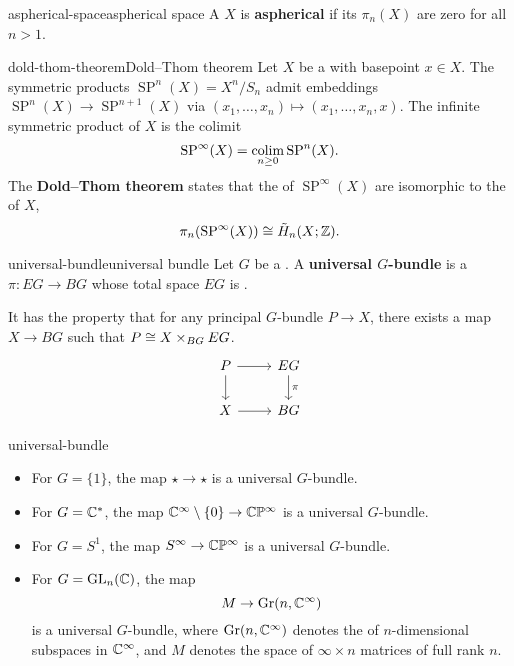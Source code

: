 \begin{topic}{aspherical-space}{aspherical space}
    A  $X$ is \textbf{aspherical} if its  $\pi_n(X)$ are zero for all $n > 1$. 
\end{topic}

\begin{topic}{dold-thom-theorem}{Dold--Thom theorem}
    Let $X$ be a   with basepoint $x \in X$. The symmetric products $\operatorname{SP}^n(X) = X^n / S_n$ admit embeddings $\operatorname{SP}^n(X) \to \operatorname{SP}^{n + 1}(X)$ via $(x_1, \ldots, x_n) \mapsto (x_1, \ldots, x_n, x)$. The infinite symmetric product of $X$ is the colimit
    \[ \operatorname{SP}^\infty(X) = \operatorname*{colim}_{n \ge 0} \operatorname{SP}^n(X) . \]
    The \textbf{Dold--Thom theorem} states that the  of $\operatorname{SP}^\infty(X)$ are isomorphic to the  of $X$,
    \[ \pi_n(\operatorname{SP}^\infty(X)) \cong \tilde{H}_n(X; \mathbb{Z}) . \]
\end{topic}

\begin{topic}{universal-bundle}{universal bundle}
    Let $G$ be a . A \textbf{universal $G$-bundle} is a  $\pi : EG \to BG$ whose total space $EG$ is .
    
    It has the property that for any principal $G$-bundle $P \to X$, there exists a map $X \to BG$ such that $P \cong X \times_{BG} EG$.
    \[ \begin{tikzcd}
        P \arrow{d} \arrow{r} & EG \arrow{d}{\pi} \\
        X \arrow{r} & BG
    \end{tikzcd} \]
\end{topic}

\begin{example}{universal-bundle}
    \begin{itemize}
        \item For $G = \{ 1 \}$, the map $\star \to \star$ is a universal $G$-bundle.
        \item For $G = \mathbb{C}^*$, the map $\mathbb{C}^\infty \setminus \{ 0 \} \to \mathbb{C} \mathbb{P}^\infty$ is a universal $G$-bundle.
        \item For $G = S^1$, the map $S^\infty \to \mathbb{C} \mathbb{P}^\infty$ is a universal $G$-bundle.
        \item For $G = \textup{GL}_n(\mathbb{C})$, the map
        \[ M \to \textup{Gr}(n, \mathbb{C}^\infty) \]
        is a universal $G$-bundle, where $\textup{Gr}(n, \mathbb{C}^\infty)$ denotes the  of $n$-dimensional subspaces in $\mathbb{C}^\infty$, and $M$ denotes the space of $\infty \times n$ matrices of full rank $n$.
    \end{itemize}
\end{example}

